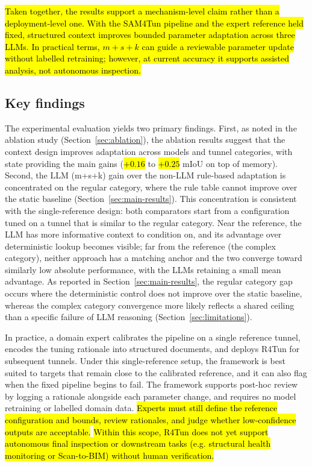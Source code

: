 \documentclass[a4paper,fleqn]{cas-dc}
\begin{document}
{\hl{Taken together, the results support a mechanism-level claim rather than a deployment-level one. With the SAM4Tun pipeline and the expert reference held fixed, structured context improves bounded parameter adaptation across three LLMs. In practical terms, \mbox{$m+s+k$} can guide a reviewable parameter update without labelled retraining; however, at current accuracy it supports assisted analysis, not autonomous inspection.}

\subsection{Key findings}

The experimental evaluation yields two primary findings. First, as noted in the ablation study (Section~\ref{sec:ablation}), the ablation results suggest that the context design improves adaptation across models and tunnel categories, with state providing the main gains (\hl{$+0.16$} to \hl{$+0.25$} mIoU on top of memory). Second, the LLM (m+s+k) gain over the non-LLM rule-based adaptation is concentrated on the regular category, where the rule table cannot improve over the static baseline (Section~\ref{sec:main-results}). This concentration is consistent with the single-reference design: both comparators start from a configuration tuned on a tunnel that is similar to the regular category. Near the reference, the LLM has more informative context to condition on, and its advantage over deterministic lookup becomes visible; far from the reference (the complex category), neither approach has a matching anchor and the two converge toward similarly low absolute performance, with the LLMs retaining a small mean advantage. As reported in Section~\ref{sec:main-results}, the regular category gap occurs where the deterministic control does not improve over the static baseline, whereas the complex category convergence more likely reflects a shared ceiling than a specific failure of LLM reasoning (Section~\ref{sec:limitations}).


In practice, a domain expert calibrates the pipeline on a single reference tunnel, encodes the tuning rationale into structured documents, and deploys R4Tun for subsequent tunnels. Under this single-reference setup, the framework is best suited to targets that remain close to the calibrated reference, and it can also flag when the fixed pipeline begins to fail. The framework supports post-hoc review by logging a rationale alongside each parameter change, and requires no model retraining or labelled domain data. \hl{Experts must still define the reference configuration and bounds, review rationales, and judge whether low-confidence outputs are acceptable.} \hl{Within this scope, R4Tun does not yet support autonomous final inspection or downstream tasks (e.g. structural health monitoring or Scan-to-BIM) without human verification.}


}
\end{document}
